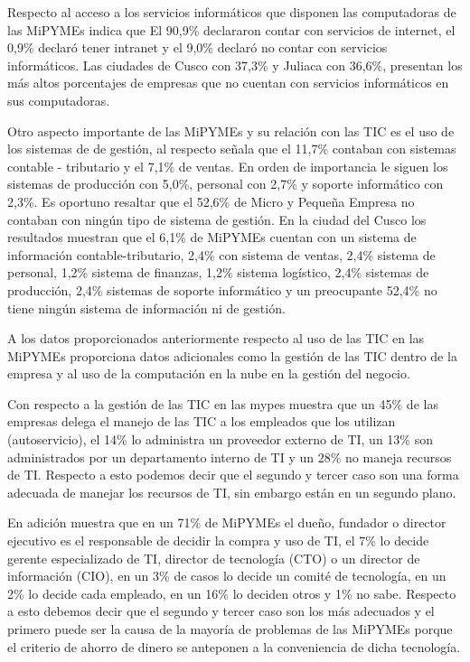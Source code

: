 Respecto al acceso a los servicios informáticos que disponen las computadoras de
las MiPYMEs \cite{inei1} indica que El 90,9\% declararon contar con servicios de
internet, el 0,9\% declaró tener intranet y el 9,0\% declaró no contar con
servicios informáticos. Las ciudades de Cusco con 37,3\% y Juliaca con 36,6\%,
presentan los más altos porcentajes de empresas que no cuentan con servicios
informáticos en sus computadoras.

Otro aspecto importante de las MiPYMEs y su relación con las TIC es el uso de los
sistemas de de gestión, al respecto \citep{inei1} señala que el 11,7\% contaban
con sistemas contable - tributario y el 7,1\% de ventas. En orden de importancia
le siguen los sistemas de producción con 5,0\%, personal con 2,7\% y soporte informático
con 2,3\%. Es oportuno resaltar que el 52,6\% de Micro y Pequeña Empresa no contaban
con ningún tipo de sistema de gestión. En la ciudad del Cusco los resultados
muestran que el 6,1\% de MiPYMEs cuentan con un sistema de información contable-tributario,
2,4\% con sistema de ventas, 2,4\% sistema de personal, 1,2\% sistema de finanzas,
1,2\% sistema logístico, 2,4\% sistemas de producción, 2,4\% sistemas de soporte
informático y un preocupante 52,4\% no tiene ningún sistema de información ni de
gestión.

A los datos proporcionados anteriormente respecto al uso de las TIC en las MiPYMEs
\cite{ipsos} proporciona datos adicionales como la gestión de las TIC dentro
de la empresa y al uso de la computación en la nube en la gestión del negocio.

Con respecto a la gestión de las TIC en las mypes \citep{ipsos} muestra que un
45\% de las empresas delega el manejo de las TIC a los empleados que los utilizan
(autoservicio), el 14\% lo administra un proveedor externo de TI, un 13\% son administrados
por un departamento interno de TI y un 28\% no maneja recursos de TI. Respecto a
esto podemos decir que el segundo y tercer caso son una forma adecuada de manejar
los recursos de TI, sin embargo están en un segundo plano.

En adición \cite{ipsos} muestra que en un 71\% de MiPYMEs el dueño, fundador o director
ejecutivo es el responsable de decidir la compra y uso de TI, el 7\% lo decide
gerente especializado de TI, director de tecnología (CTO) o un director de información
(CIO), en un 3\% de casos lo decide un comité de tecnología, en un 2\% lo decide
cada empleado, en un 16\% lo deciden otros y 1\% no sabe. Respecto a esto debemos
decir que el segundo y tercer caso son los más adecuados y el primero puede ser la
causa de la mayoría de problemas de las MiPYMEs porque el criterio de ahorro de dinero
se anteponen a la conveniencia de dicha tecnología.

